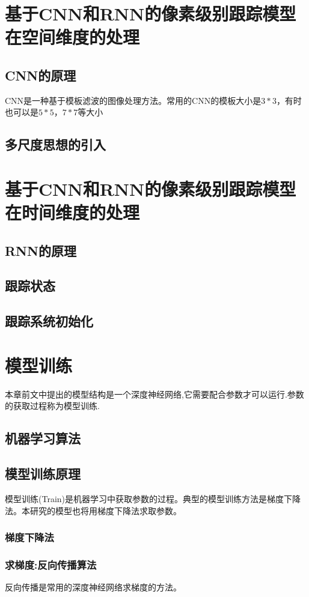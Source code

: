 \section{基于CNN和RNN的像素级别跟踪模型在空间维度的处理}
\subsection{CNN的原理}
CNN是一种基于模板滤波的图像处理方法。常用的CNN的模板大小是$3*3$，有时也可以是$5*5$，$7*7$等大小
\subsection{多尺度思想的引入}
\section{基于CNN和RNN的像素级别跟踪模型在时间维度的处理}
\subsection{RNN的原理}
\subsection{跟踪状态}
\subsection{跟踪系统初始化}


\section{模型训练}
本章前文中提出的模型结构是一个深度神经网络,它需要配合参数才可以运行.参数的获取过程称为模型训练.

\subsection{机器学习算法}

\subsection{模型训练原理}
模型训练(Train)是机器学习中获取参数的过程。典型的模型训练方法是梯度下降法。本研究的模型也将用梯度下降法求取参数。
\subsubsection{梯度下降法}

\subsubsection{求梯度:反向传播算法}
反向传播是常用的深度神经网络求梯度的方法。